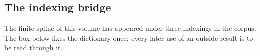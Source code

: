 \documentclass[11pt,oneside]{article}
\theoremstyle{plain}
\theoremstyle{definition}
\theoremstyle{remark}
\begin{document}
\subsection{The indexing bridge}
\label{due:sec:set-bridge}

The finite spline of this volume has appeared under three indexings in the
corpus.  The box below fixes the dictionary once; every later use of an
outside result is to be read through it.

\end{document}
